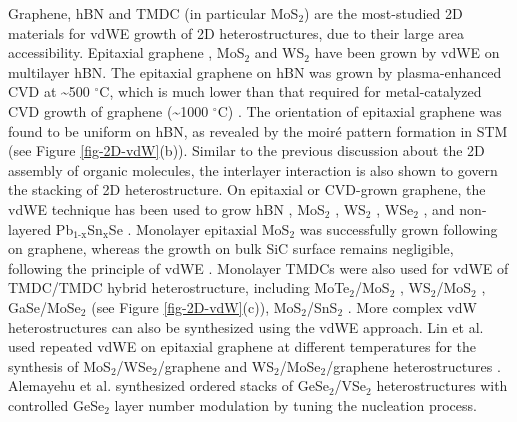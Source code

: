 Graphene, hBN and TMDC (in particular MoS\(_{\text{2}}\)) are the most-studied 2D
materials for vdWE growth of 2D heterostructures, due to their large
area accessibility. Epitaxial graphene \cite{Yang_2013_gr_hBN}, MoS\(_{\text{2}}\)
\cite{Yan_2015_MoS2_on_hBN,Wang_2015_cvd_MoS2_BN} and WS\(_{\text{2}}\)
\cite{Cattelan_2015_Ws2_hBN} have been grown by vdWE on multilayer
hBN. The epitaxial graphene on hBN was grown by plasma-enhanced CVD at
\textasciitilde{}500 \(^{\circ} \mathrm{C}\), which is much lower than that required for
metal-catalyzed CVD growth of graphene (\textasciitilde{}1000 \(^{\circ} \mathrm{C}\))
\cite{Yang_2013_gr_hBN}.  The orientation of epitaxial graphene was
found to be uniform on hBN, as revealed by the moiré pattern formation
in STM (see Figure \ref{fig-2D-vdW}(b)). Similar to the previous
discussion about the 2D assembly of organic molecules, the interlayer
interaction is also shown to govern the stacking of 2D
heterostructure. On epitaxial or CVD-grown graphene, the vdWE
technique has been used to grow hBN \cite{Lin_2014_vdW_solid}, MoS\(_{\text{2}}\)
\cite{Shi_2012_vdw_epi_MoS2_gr,Lin_2014_vdW_solid,McCreary_2014_MoS2_gr,Azizi_2015_Freevdw_Gr_TMDCs,Miwa_2015_MoS2_gr,Ago_2015_MoS2_Gr},
WS\(_{\text{2}}\) \cite{Azizi_2015_Freevdw_Gr_TMDCs}, WSe\(_{\text{2}}\)
\cite{Lin_2014_WS2_Gr,Lin_2015_Wse2_MoS2_gr}, and non-layered
Pb\(_{\text{1-x}}\)Sn\(_{\text{x}}\)Se \cite{Wang_2015_vdw_non_layer}. Monolayer epitaxial
MoS\(_{\text{2}}\) was successfully grown following on graphene, whereas the
growth on bulk SiC surface remains negligible, following the principle
of vdWE \cite{Lin_2014_vdW_solid}. Monolayer TMDCs were also used for
vdWE of TMDC/TMDC hybrid heterostructure, including MoTe\(_{\text{2}}\)/MoS\(_{\text{2}}\)
\cite{Diaz_2015_MoTe2_MoSe2}, WS\(_{\text{2}}\)/MoS\(_{\text{2}}\) \cite{Gong_2014_WS2_MoS2},
GaSe/MoSe\(_{\text{2}}\) \cite{Li_2016_GaSe_MoSe2_vdW} (see Figure
\ref{fig-2D-vdW}(c)), MoS\(_{\text{2}}\)/SnS\(_{\text{2}}\)
\cite{Zhang_2014_vdw_epi_SnS2_MoS2}. More complex vdW heterostructures
can also be synthesized using the vdWE approach. Lin et al. used
repeated vdWE on epitaxial graphene at different temperatures for the
synthesis of MoS\(_{\text{2}}\)/WSe\(_{\text{2}}\)/graphene and WS\(_{\text{2}}\)/MoSe\(_{\text{2}}\)/graphene
heterostructures \cite{Lin_2015_Wse2_MoS2_gr}. Alemayehu et
al. synthesized ordered stacks of GeSe\(_{\text{2}}\)/VSe\(_{\text{2}}\) heterostructures
\cite{Alemayehu_2015_TMDC_vdw} with controlled GeSe\(_{\text{2}}\)
layer number modulation by tuning the nucleation process.

